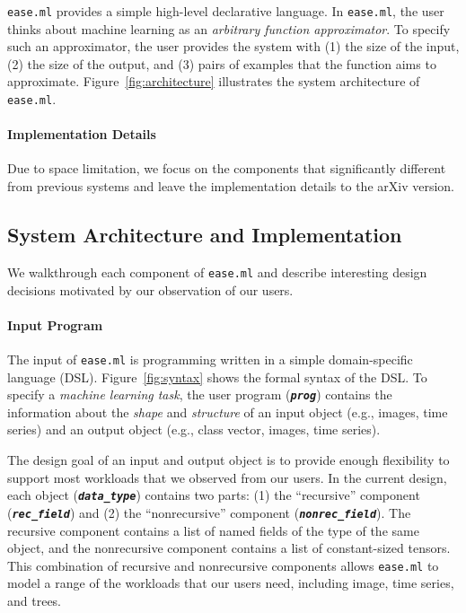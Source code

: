 \documentclass[letterpaper]{vldb}
\newcommand{\eml}{\texttt{ease.ml}\xspace}
\begin{document}
\eml provides a simple high-level declarative language.
In \eml, the user thinks about machine learning as an {\em arbitrary function approximator}.
To specify such an approximator, the user provides the
system with (1) the size of the input, (2) the size of the output,
and (3) pairs of examples that the function aims to approximate.
Figure~\ref{fig:architecture} illustrates the system architecture of \eml.

\vspace{-1em}
\paragraph*{Implementation Details} Due to space
limitation, we focus on the components that significantly
different from previous systems and 
leave the implementation
details to the arXiv version. 

\vspace{-0.75em}
\subsection{System Architecture and Implementation}

We walkthrough each component of \eml and 
describe interesting design decisions
motivated by our observation of our users. 

\vspace{-1em}
\paragraph*{Input Program} The input
of \eml is programming written in 
a simple domain-specific language (DSL). Figure~\ref{fig:syntax}
shows the formal syntax of the DSL. To specify
a {\em machine learning task}, the user program (\textbf{\texttt{\em prog}})
contains the information about the {\em shape}
and {\em structure} of an input object (e.g., images, time series)
and an output object (e.g., class vector, images, time series).

The design goal of an input and output
object is to provide enough flexibility to support most
workloads that we observed from our users. In the current design,
each object (\textbf{\texttt{\em data\_type}}) contains two parts:
(1) the ``recursive'' component (\textbf{\texttt{\em rec\_field}})
and (2) the ``nonrecursive'' component (\textbf{\texttt{\em nonrec\_field}}).
The recursive component contains a list of named 
fields of the type of the same object, and the nonrecursive
component contains a list of constant-sized tensors.
This combination of recursive and nonrecursive
components allows \eml to model a range of the workloads that our users need, including image, time series, and trees.
\end{document}
